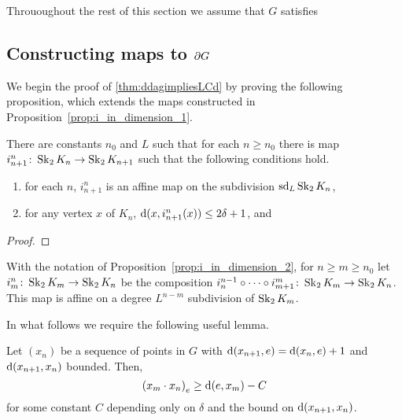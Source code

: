 \documentclass[a4paper]{article}
\begin{document}
Thrououghout the rest of this section we assume that $G$ satisfies

\subsection{Constructing maps to $\boundary G$}

We begin the proof of \cref{thm:ddagimpliesLCd} by proving the following 
proposition, which extends the maps constructed in
Proposition~\ref{prop:i_in_dimension_1}.

\begin{proposition}\label{prop:i_in_dimension_2}
  There are constants $n_0$ and $L$ such that for each $n\geq n_0$ there is map
  $i^n_{n+1}\from\Skel_2 K_n \to \Skel_2 K_{n+1}$ such that the
  following conditions hold.
  \begin{enumerate}
    \item for each $n$, $i^n_{n+1}$ is an affine map on the subdivision
      $\sd_L\Skel_2 K_n$,
    \item for any vertex $x$ of $K_n$, $\dist(x, i^n_{n+1}(x)) \leq 2\delta+1$,
      and
  \end{enumerate}
\end{proposition}

\begin{proof}
\end{proof}

\begin{definition}
  With the notation of Proposition~\ref{prop:i_in_dimension_2}, for $n \geq m
  \geq n_0$ let $i^n_m \from \Skel_2 K_m \to \Skel_2 K_n$ be the composition
  $i^{n-1}_n \composed \dotsb \composed i^m_{m+1} \from \Skel_2 K_m \to 
  \Skel_2 K_n$.  This map is affine on a degree $L^{n-m}$ subdivision of 
  $\Skel_2 K_m$.
\end{definition}

In what follows we require the following useful lemma.

\begin{lemma}\label{lem:useful}
  Let $(x_n)$ be a sequence of points in $G$ with $\dist(x_{n+1}, e) = 
  \dist(x_n, e) + 1$ and $\dist(x_{n+1}, x_n)$ bounded. Then,
  \begin{equation*}
    \gromov{e}{x_m}{x_n} \geq \dist(e,x_m) - C
  \end{equation*}
  for some constant $C$ depending only on $\delta$ and the bound on 
  $\dist(x_{n+1}, x_n)$.
\end{lemma}
\end{document}
